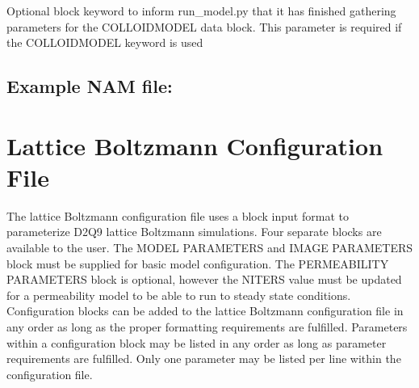 \documentclass[letterpaper,10pt,english]{sphinxmanual}
\begin{document}
 Optional block keyword to inform run\_model.py that
it has finished gathering parameters for the COLLOIDMODEL data block.
This parameter is required if the COLLOIDMODEL keyword is used


\subsection{Example NAM file:}
\label{\detokenize{index:example-nam-file}}


\section{Lattice Boltzmann Configuration File}
\label{\detokenize{index:lattice-boltzmann-configuration-file}}
The lattice Boltzmann configuration file uses a block input format to
parameterize D2Q9 lattice Boltzmann simulations. Four separate
blocks are available to the user. The MODEL PARAMETERS and IMAGE
PARAMETERS block must be supplied for basic model configuration. The
PERMEABILITY PARAMETERS block is optional, however the NITERS value
must be updated for a permeability model to be able to run to steady
state conditions. Configuration blocks can be added to the lattice
Boltzmann configuration file in any order as long as the proper
formatting requirements are fulfilled. Parameters within a configuration
block may be listed in any order as long as parameter requirements are
fulfilled. Only one parameter may be listed per line within the
configuration file.
\end{document}
